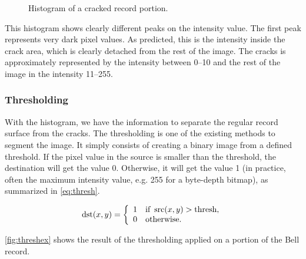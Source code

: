 \begin{figure}[!ht]
\centering
{}
\caption{Histogram of a cracked record portion.}
\label{fig:histocrack}
\end{figure}

This histogram shows clearly different peaks on the intensity value. The first peak represents very dark pixel values. As predicted, this is the intensity inside the crack area, which is clearly detached from the rest of the image. The cracks is approximately represented by the intensity between \numrange[range-phrase=--]{0}{10} and the rest of the image in the intensity \numrange[range-phrase=--]{11}{255}.

\subsubsection{Thresholding}

With the histogram, we have the information to separate the regular record surface from the cracks. The thresholding is one of the existing methods to segment the image. It simply consists of creating a binary image from a defined threshold. If the pixel value in the source is smaller than the threshold, the destination will get the value 0. Otherwise, it will get the value 1 (in practice, often the maximum intensity value, e.g. 255 for a byte-depth bitmap), as summarized in \eqref{eq:thresh}.

\begin{equation}
\label{eq:thresh}
\operatorname{dst}(x, y) =
\left\{
\begin{array}{l l}
    1 & \text{if } \operatorname{src}(x, y) > \text{thresh},\\
    0 & \text{otherwise}.
\end{array}
\right.
\end{equation}

\autoref{fig:threshex} shows the result of the thresholding applied on a portion of the Bell record.

